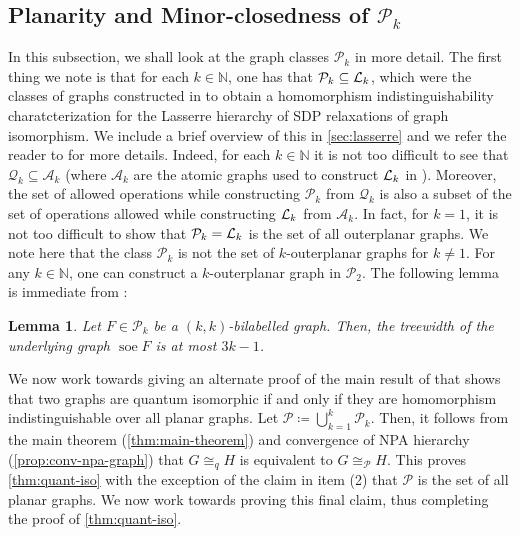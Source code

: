 \documentclass[11pt,a4paper]{article}
\theoremstyle{plain}
\newtheorem{lem}[thm]{Lemma}
\theoremstyle{remark}
\theoremstyle{definition}
\DeclareMathOperator{\soe}{soe}
\def\calA{{\mathcal A}} \def\calB{{\mathcal B}} \def\calC{{\mathcal C}}
\def\calP{{\mathcal P}} \def\calQ{{\mathcal Q}} \def\calR{{\mathcal R}}
\begin{document}
\subsection{Planarity and Minor-closedness of $\calP_k$}\label{sub-sec:graph-class}



In this subsection, we shall look at the graph classes $\calP_k$ in more detail. The first thing we note is that for each $k \in \mathbb{N}$, one has that $\calP_k \subseteq \calL_k$, which were the classes of graphs constructed in \cite{roberson-seppelt-arxiv} to obtain a homomorphism indistinguishability charatcterization for the Lasserre hierarchy of SDP relaxations of graph isomorphism. We include a brief overview of this in \cref{sec:lasserre} and we refer the reader to \cite{roberson-seppelt-arxiv} for more details. Indeed, for each $k \in \mathbb{N}$ it is not too difficult to see that $\calQ_k \subseteq \calA_k$ (where $\calA_k$ are the atomic graphs used to construct ${\mathcal L}_k$ in \cite{roberson-seppelt-arxiv}). Moreover, the set of allowed operations while constructing $\calP_k$ from $\calQ_k$ is also a subset of the set of operations allowed while constructing ${\mathcal L}_k$ from $\calA_k$. In fact, for $k = 1$, it is not too difficult to show that $\calP_k = \calL_k$ is the set of all outerplanar graphs. We note here that the class $\calP_k$ is not the set of $k$-outerplanar graphs for $k \neq 1$. For any $k \in \mathbb{N}$, one can construct a $k$-outerplanar graph in $\calP_2$. The following lemma is immediate from \cite[Lemma~4.7]{roberson-seppelt-arxiv}:

\begin{lem}\label{lem:bounded-tw}
    Let $F \in \calP_k$ be a $(k,k)$-bilabelled graph. Then, the treewidth of the underlying graph $\soe F$ is at most $3k -1$. 
\end{lem}

We now work towards giving an alternate proof of the main result of \cite{david-laura} that shows that two graphs are quantum isomorphic if and only if they are homomorphism indistinguishable over all planar graphs. Let $\mathcal{P} \coloneqq \bigcup_{k=1}^k \calP_k$. Then, it follows from the main theorem (\cref{thm:main-theorem}) and convergence of NPA hierarchy (\cref{prop:conv-npa-graph}) that $G \cong_q H$ is equivalent to $G \cong_{\calP} H$. This proves \cref{thm:quant-iso} with the exception of the claim in item (2) that $\calP$ is the set of all planar graphs. We now work towards proving this final claim, thus completing the proof of \cref{thm:quant-iso}.  
\end{document}
